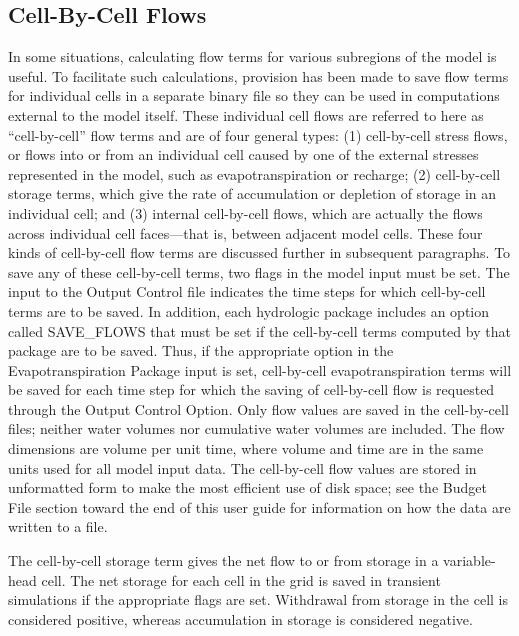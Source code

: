 \subsection{Cell-By-Cell Flows}
In some situations, calculating flow terms for various subregions of the model is useful.  To facilitate such calculations, provision has been made to save flow terms for individual cells in a separate binary file so they can be used in computations external to the model itself.  These individual cell flows are referred to here as ``cell-by-cell'' flow terms and are of four general types: (1) cell-by-cell stress flows, or flows into or from an individual cell caused by one of the external stresses represented in the model, such as evapotranspiration or recharge; (2) cell-by-cell storage terms, which give the rate of accumulation or depletion of storage in an individual cell; and (3) internal cell-by-cell flows, which are actually the flows across individual cell faces---that is, between adjacent model cells.  These four kinds of cell-by-cell flow terms are discussed further in subsequent paragraphs.  To save any of these cell-by-cell terms, two flags in the model input must be set.  The input to the Output Control file indicates the time steps for which cell-by-cell terms are to be saved. In addition, each hydrologic package includes an option called SAVE\_FLOWS that must be set if the cell-by-cell terms computed by that package are to be saved.  Thus, if the appropriate option in the Evapotranspiration Package input is set, cell-by-cell evapotranspiration terms will be saved for each time step for which the saving of cell-by-cell flow is requested through the Output Control Option.  Only flow values are saved in the cell-by-cell files; neither water volumes nor cumulative water volumes are included.  The flow dimensions are volume per unit time, where volume and time are in the same units used for all model input data.  The cell-by-cell flow values are stored in unformatted form to make the most efficient use of disk space; see the Budget File section toward the end of this user guide for information on how the data are written to a file.

The cell-by-cell storage term gives the net flow to or from storage in a variable-head cell.  The net storage for each cell in the grid is saved in transient simulations if the appropriate flags are set.  Withdrawal from storage in the cell is considered positive, whereas accumulation in storage is considered negative.

